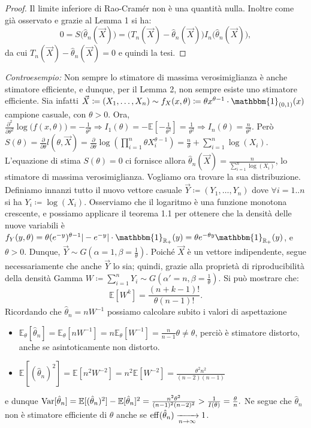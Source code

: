 \begin{proof}
Il limite inferiore di Rao-Cramér non è una quantità nulla. Inoltre come già osservato e grazie al Lemma 1 si ha:
$$0=S\big(\hat{\theta}_n(\vec{X})\big)= \big(T_n(\vec{X})-\hat{\theta}_n(\vec{X})\big)I_n\big(\hat{\theta}_n(\vec{X})\big),$$ da cui $T_n(\vec{X})-\hat{\theta}_n(\vec{X})=0$ e quindi la tesi.

\end{proof}
\textit{Controesempio:} Non sempre lo stimatore di massima verosimiglianza è anche stimatore efficiente, e dunque, per il Lemma 2, non sempre esiste uno stimatore efficiente. Sia infatti 
$\vec{X}\coloneqq (X_1,\ldots,X_n)\sim f_X(x,\theta)\coloneqq \theta x^{\theta -1}\cdot\mathbbm{1}_{(0,1)}(x)$ campione casuale, con $\theta>0$. 
Ora, $\frac{\partial^2}{\partial\theta^2}\log \big(f(x,\theta)\big)=-\frac{1}{\theta^2}\Rightarrow I_1(\theta)=-\mathbb{E}[-\frac{1}{\theta^2}]=\frac{1}{\theta^2}\Rightarrow I_n(\theta)=\frac{n}{\theta^2}$. Però $S(\theta)=\frac{\partial}{\partial\theta}l(\theta,\vec{X})=\frac{\partial}{\partial\theta}\log\left(\prod_{i=1}^n \theta X_i^{\theta -1}\right)=\frac{n}{\theta}+\sum_{i=1}^n \log(X_i).$ L'equazione di stima $S(\theta)=0$ ci fornisce allora $\hat{\theta}_n(\vec{X})=\frac{n}{\sum_{i=1}^n \log(X_i)}$, lo stimatore di massima verosimiglianza. Vogliamo ora trovare la sua distribuzione. Definiamo innanzi tutto il nuovo vettore casuale $\vec{Y}\coloneqq (Y_1,\ldots,Y_n)$ dove $\forall i=1..n$ si ha $Y_i \coloneqq \log(X_i)$. Osserviamo che il logaritmo è una funzione monotona crescente, e possiamo applicare il teorema 1.1 per ottenere che la densità delle nuove variabili è $f_Y(y,\theta)=\theta (e^{-y})^{\theta -1}|-e^{-y}|\cdot \mathbbm{1}_{\mathbb{R}_+}(y)=\theta e^{-\theta y}\mathbbm{1}_{\mathbb{R}_+}(y)$, e $\theta>0.$ Dunque, $\vec{Y}\sim G(\alpha =1, \beta = \frac{1}{\theta})$. Poiché $\vec{X}$ è un vettore indipendente, segue necessariamente che anche $\vec{Y}$ lo sia; quindi, grazie alla proprietà di riproducibilità della densità Gamma $W\coloneqq \sum_{i=1}^n Y_i \sim G(\alpha' =n, \beta=\frac{1}{\theta})$. Si può mostrare che: $$\mathbb{E}[W^k]=\frac{(n+k-1)!}{\theta (n-1)!}.$$ Ricordando che $\hat{\theta}_n=nW^{-1}$ possiamo calcolare subito i valori di aspettazione
\begin{itemize}[noitemsep]
\item $\mathbb{E}_\theta[\hat{\theta}_n]=\mathbb{E}_\theta [nW^{-1}]=n\mathbb{E}_\theta [W^{-1}]=\frac{n}{n-1}\theta \neq \theta$, perciò è stimatore distorto, anche se asintoticamente non distorto.
\item $\mathbb{E}[(\hat{\theta}_n)^2]=\mathbb{E}[n^2 W^{-2}]=n^2\mathbb{E}[W^{-2}]=\frac{\theta^2 n^2}{(n-2)(n-1)}$
\end{itemize}
e dunque $\operatorname{Var}[\hat{\theta}_n]=\mathbb{E}[(\hat{\theta}_n)^2]-\mathbb{E}[\hat{\theta}_n]^2=\frac{n^2\theta^2}{(n-1)^2(n-2)^2}>\frac{1}{I(\theta)}=\frac{\theta}{n}.$ Ne segue che $\hat{\theta}_n$ non è stimatore efficiente di $\theta$ anche se $\operatorname{eff}(\hat{\theta}_n) \xrightarrow[n\rightarrow \infty]{} 1$.

